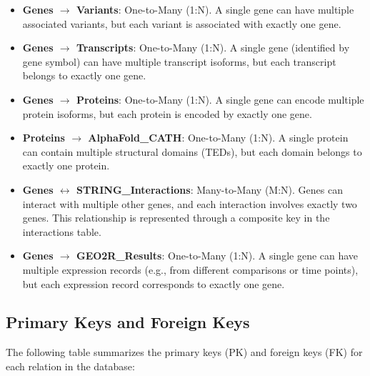 \documentclass[11pt]{article}
\begin{document}
\begin{itemize}
	\item \textbf{Genes $\rightarrow$ Variants}: One-to-Many (1:N). A single gene can have multiple associated variants, but each variant is associated with exactly one gene.
	
	\item \textbf{Genes $\rightarrow$ Transcripts}: One-to-Many (1:N). A single gene (identified by gene symbol) can have multiple transcript isoforms, but each transcript belongs to exactly one gene.
	
	\item \textbf{Genes $\rightarrow$ Proteins}: One-to-Many (1:N). A single gene can encode multiple protein isoforms, but each protein is encoded by exactly one gene.
	
	\item \textbf{Proteins $\rightarrow$ AlphaFold\_CATH}: One-to-Many (1:N). A single protein can contain multiple structural domains (TEDs), but each domain belongs to exactly one protein.
	
	\item \textbf{Genes $\leftrightarrow$ STRING\_Interactions}: Many-to-Many (M:N). Genes can interact with multiple other genes, and each interaction involves exactly two genes. This relationship is represented through a composite key in the interactions table.
	
	\item \textbf{Genes $\rightarrow$ GEO2R\_Results}: One-to-Many (1:N). A single gene can have multiple expression records (e.g., from different comparisons or time points), but each expression record corresponds to exactly one gene.
\end{itemize}

\subsection{Primary Keys and Foreign Keys}

The following table summarizes the primary keys (PK) and foreign keys (FK) for each relation in the database:
\end{document}
